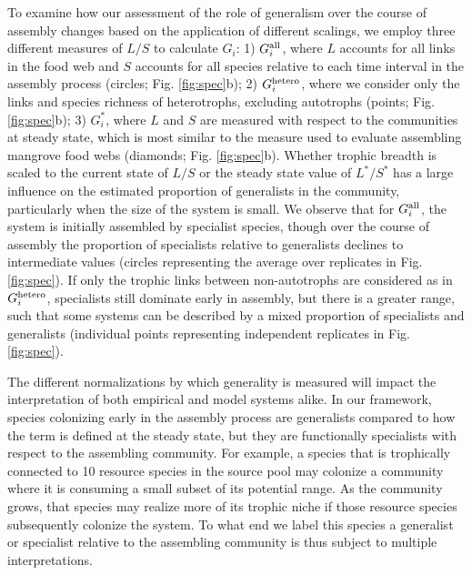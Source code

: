 \documentclass[twocolumn,preprintnumbers,amsmath,amssymb,superscriptaddress,linenumbers]{revtex4-1}
\newcommand{\rr}[1]{{\rm #1}}
\begin{document}
To examine how our assessment of the role of generalism over the course of assembly changes based on the application of different scalings, we employ three different measures of $L/S$ to calculate $G_i$:
1) $G_i^{\rr{all}}$, where $L$ accounts for all links in the food web and $S$ accounts for all species relative to each time interval in the assembly process (circles; Fig. \ref{fig:spec}b);
2) $G_i^{\rr{hetero}}$, where we consider only the links and species richness of heterotrophs, excluding autotrophs (points; Fig. \ref{fig:spec}b);
3) $G_i^*$, where $L$ and $S$ are measured with respect to the communities at steady state, which is most similar to the measure used to evaluate assembling mangrove food webs (diamonds; Fig. \ref{fig:spec}b).
Whether trophic breadth is scaled to the current state of $L/S$ or the steady state value of $L^*/S^*$ has a large influence on the estimated proportion of generalists in the community, particularly when the size of the system is small.
We observe that for $G_i^{\rr{all}}$, the system is initially assembled by specialist species, though over the course of assembly the proportion of specialists relative to generalists declines to intermediate values (circles representing the average over replicates in Fig. \ref{fig:spec}).
If only the trophic links between non-autotrophs are considered as in $G_i^{\rr{hetero}}$, specialists still dominate early in assembly, but there is a greater range, such that some systems can be described by a mixed proportion of specialists and generalists (individual points representing independent replicates in Fig. \ref{fig:spec}).

The different normalizations by which generality is measured will impact the interpretation of both empirical and model systems alike.
In our framework, species colonizing early in the assembly process are generalists compared to how the term is defined at the steady state, but they are functionally specialists with respect to the assembling community.
For example, a species that is trophically connected to 10 resource species in the source pool may colonize a community where it is consuming a small subset of its potential range.
As the community grows, that species may realize more of its trophic niche if those resource species subsequently colonize the system.
To what end we label this species a generalist or specialist relative to the assembling community is thus subject to multiple interpretations.
\end{document}
